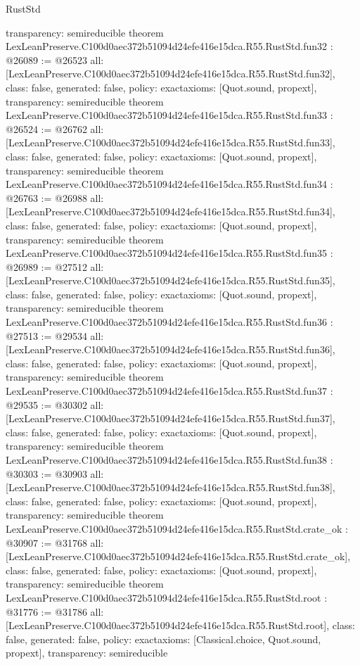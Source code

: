 \begin{lexlean}{RustStd}
\begin{coremodule}
{  transparency: semireducible
}
theorem LexLeanPreserve.C100d0aec372b51094d24efe416e15dca.R55.RustStd.fun32 : @26089 := @26523 {
  all: [LexLeanPreserve.C100d0aec372b51094d24efe416e15dca.R55.RustStd.fun32],
  class: false,
  generated: false,
  policy: exact{axioms: [Quot.sound, propext]},
  transparency: semireducible
}
theorem LexLeanPreserve.C100d0aec372b51094d24efe416e15dca.R55.RustStd.fun33 : @26524 := @26762 {
  all: [LexLeanPreserve.C100d0aec372b51094d24efe416e15dca.R55.RustStd.fun33],
  class: false,
  generated: false,
  policy: exact{axioms: [Quot.sound, propext]},
  transparency: semireducible
}
theorem LexLeanPreserve.C100d0aec372b51094d24efe416e15dca.R55.RustStd.fun34 : @26763 := @26988 {
  all: [LexLeanPreserve.C100d0aec372b51094d24efe416e15dca.R55.RustStd.fun34],
  class: false,
  generated: false,
  policy: exact{axioms: [Quot.sound, propext]},
  transparency: semireducible
}
theorem LexLeanPreserve.C100d0aec372b51094d24efe416e15dca.R55.RustStd.fun35 : @26989 := @27512 {
  all: [LexLeanPreserve.C100d0aec372b51094d24efe416e15dca.R55.RustStd.fun35],
  class: false,
  generated: false,
  policy: exact{axioms: [Quot.sound, propext]},
  transparency: semireducible
}
theorem LexLeanPreserve.C100d0aec372b51094d24efe416e15dca.R55.RustStd.fun36 : @27513 := @29534 {
  all: [LexLeanPreserve.C100d0aec372b51094d24efe416e15dca.R55.RustStd.fun36],
  class: false,
  generated: false,
  policy: exact{axioms: [Quot.sound, propext]},
  transparency: semireducible
}
theorem LexLeanPreserve.C100d0aec372b51094d24efe416e15dca.R55.RustStd.fun37 : @29535 := @30302 {
  all: [LexLeanPreserve.C100d0aec372b51094d24efe416e15dca.R55.RustStd.fun37],
  class: false,
  generated: false,
  policy: exact{axioms: [Quot.sound, propext]},
  transparency: semireducible
}
theorem LexLeanPreserve.C100d0aec372b51094d24efe416e15dca.R55.RustStd.fun38 : @30303 := @30903 {
  all: [LexLeanPreserve.C100d0aec372b51094d24efe416e15dca.R55.RustStd.fun38],
  class: false,
  generated: false,
  policy: exact{axioms: [Quot.sound, propext]},
  transparency: semireducible
}
theorem LexLeanPreserve.C100d0aec372b51094d24efe416e15dca.R55.RustStd.crate_ok : @30907 := @31768 {
  all: [LexLeanPreserve.C100d0aec372b51094d24efe416e15dca.R55.RustStd.crate_ok],
  class: false,
  generated: false,
  policy: exact{axioms: [Quot.sound, propext]},
  transparency: semireducible
}
theorem LexLeanPreserve.C100d0aec372b51094d24efe416e15dca.R55.RustStd.root : @31776 := @31786 {
  all: [LexLeanPreserve.C100d0aec372b51094d24efe416e15dca.R55.RustStd.root],
  class: false,
  generated: false,
  policy: exact{axioms: [Classical.choice, Quot.sound, propext]},
  transparency: semireducible
}


\end{coremodule}
\end{lexlean}
